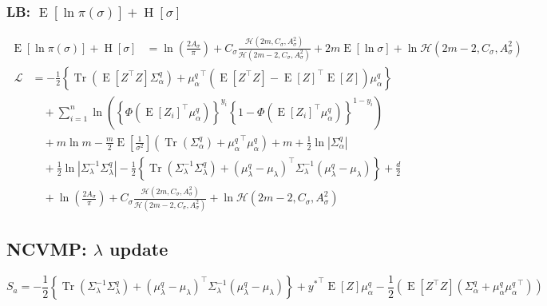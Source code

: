 \documentclass[11pt]{article}
\DeclareMathOperator{\Tr}{Tr}
\newcommand{\opn}{\operatorname}
\begin{document}
\subsubsection{LB: $\opn{E}\left[\ln \pi\left(\sigma\right)\right]+\opn{H}\left[\sigma\right]$}
\begin{align*}
  \opn{E}\left[\ln \pi\left(\sigma\right)\right]+\opn{H}\left[\sigma\right] &= \ln\left(\frac{2A_{\sigma}}{\pi}\right)+C_{\sigma}\frac{\mathcal{H}\left(2m,C_{\sigma},A_{\sigma}^{2}\right)}{\mathcal{H}\left(2m-2,C_{\sigma},A_{\sigma}^{2}\right)}+2m\opn{E}\left[\ln\sigma\right]+\ln \mathcal{H}\left(2m-2,C_{\sigma},A_{\sigma}^{2}\right)
\end{align*}
\begin{align*}
  \mathcal{L} &= -\frac{1}{2}\left\{\Tr\left(\opn{E}\left[Z^{\top}Z\right]\Sigma_{\alpha}^{q}\right)+{\mu_{\alpha}^{q}}^{\top}\left(\opn{E}\left[Z^{\top}Z\right]-\opn{E}\left[Z\right]^{\top}\opn{E}\left[Z\right]\right)\mu_{\alpha}^{q} \right\}\\
  &\quad +\sum_{i=1}^{n}\ln\left(\left\{\Phi\left(\opn{E}\left[Z_{i}\right]^{\top}\mu_{\alpha}^{q}\right) \right\}^{y_{i}}\left\{1-\Phi\left(\opn{E}\left[Z_{i}\right]^{\top}\mu_{\alpha}^{q}\right) \right\}^{1-y_{i}} \right)\\
  &\quad +m\ln m -\frac{m}{2}\opn{E}\left[\frac{1}{\sigma^{2}}\right]\left(\Tr\left(\Sigma_{\alpha}^{q}\right)+{\mu_{\alpha}^{q}}^{\top}\mu_{\alpha}^{q}\right) +m + \frac{1}{2}\ln\left|\Sigma_{\alpha}^{q}\right|\\
  &\quad +\frac{1}{2}\ln\left|\Sigma_{\lambda}^{-1}\Sigma_{\lambda}^{q}\right| -\frac{1}{2}\left\{\Tr\left(\Sigma_{\lambda}^{-1}\Sigma_{\lambda}^{q}\right) +\left(\mu_{\lambda}^{q}-\mu_{\lambda}\right)^{\top}\Sigma_{\lambda}^{-1}\left(\mu_{\lambda}^{q}-\mu_{\lambda}\right) \right\} + \frac{d}{2}\\
  &\quad +\ln\left(\frac{2A_{\sigma}}{\pi}\right)+C_{\sigma}\frac{\mathcal{H}\left(2m,C_{\sigma},A_{\sigma}^{2}\right)}{\mathcal{H}\left(2m-2,C_{\sigma},A_{\sigma}^{2}\right)}+\ln \mathcal{H}\left(2m-2,C_{\sigma},A_{\sigma}^{2}\right)
\end{align*}
\subsection{NCVMP: $\lambda$ update}
$$
  S_{a} = -\frac{1}{2}\left\{\Tr\left(\Sigma_{\lambda}^{-1}\Sigma_{\lambda}^{q}\right) +\left(\mu_{\lambda}^{q}-\mu_{\lambda}\right)^{\top}\Sigma_{\lambda}^{-1}\left(\mu_{\lambda}^{q}-\mu_{\lambda}\right) \right\} +{y^{*}}^{\top}\opn{E}\left[Z\right]\mu_{\alpha}^{q}-\frac{1}{2}\left(\opn{E}\left[Z^{\top}Z\right]\left(\Sigma_{\alpha}^{q}+\mu_{\alpha}^{q}{\mu_{\alpha}^{q}}^{\top}\right)\right)
$$
\end{document}
